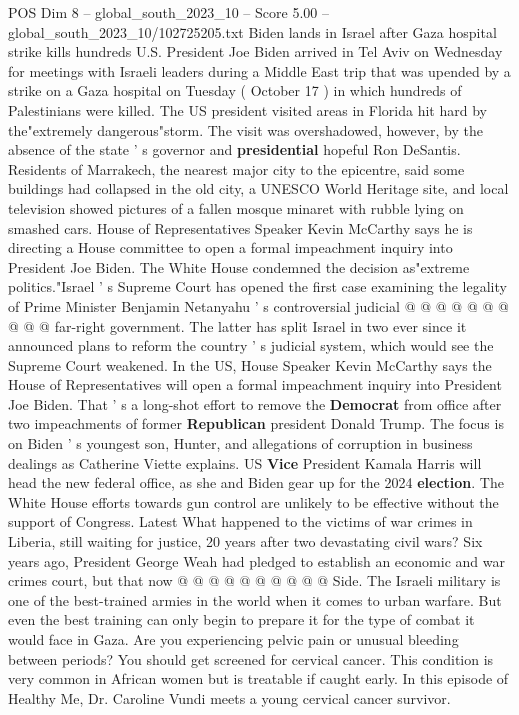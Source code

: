 \begin{textsample}{POS Dim 8 – global\_south\_2023\_10 – Score 5.00 – global\_south\_2023\_10/102725205.txt}  \label{ex:f8_pos_364}
Biden lands in Israel after Gaza hospital strike kills hundreds U.S.
President Joe Biden arrived in Tel Aviv on Wednesday for meetings with Israeli leaders during a Middle East trip that was upended by a strike on a Gaza hospital on Tuesday ( October 17 ) in which hundreds of Palestinians were killed.
The US president visited areas in Florida hit hard by the"extremely dangerous"storm.
The visit was overshadowed, however, by the absence of the state ' s governor and \textbf{presidential} hopeful Ron DeSantis.
Residents of Marrakech, the nearest major city to the epicentre, said some buildings had collapsed in the old city, a UNESCO World Heritage site, and local television showed pictures of a fallen mosque minaret with rubble lying on smashed cars.
House of Representatives Speaker Kevin McCarthy says he is directing a House committee to open a formal impeachment inquiry into President Joe Biden.
The White House condemned the decision as"extreme politics."Israel ' s Supreme Court has opened the first case examining the legality of Prime Minister Benjamin Netanyahu ' s controversial judicial @ @ @ @ @ @ @ @ @ @ far-right government.
The latter has split Israel in two ever since it announced plans to reform the country ' s judicial system, which would see the Supreme Court weakened.
In the US, House Speaker Kevin McCarthy says the House of Representatives will open a formal impeachment inquiry into President Joe Biden.
That ' s a long-shot effort to remove the \textbf{Democrat} from office after two impeachments of former \textbf{Republican} president Donald Trump.
The focus is on Biden ' s youngest son, Hunter, and allegations of corruption in business dealings as Catherine Viette explains.
US \textbf{Vice} President Kamala Harris will head the new federal office, as she and Biden gear up for the 2024 \textbf{election}.
The White House efforts towards gun control are unlikely to be effective without the support of Congress.
Latest What happened to the victims of war crimes in Liberia, still waiting for justice, 20 years after two devastating civil wars?
Six years ago, President George Weah had pledged to establish an economic and war crimes court, but that now @ @ @ @ @ @ @ @ @ @ Side.
The Israeli military is one of the best-trained armies in the world when it comes to urban warfare.
But even the best training can only begin to prepare it for the type of combat it would face in Gaza.
Are you experiencing pelvic pain or unusual bleeding between periods?
You should get screened for cervical cancer.
This condition is very common in African women but is treatable if caught early.
In this episode of Healthy Me, Dr.
Caroline Vundi meets a young cervical cancer survivor.

\end{textsample}
